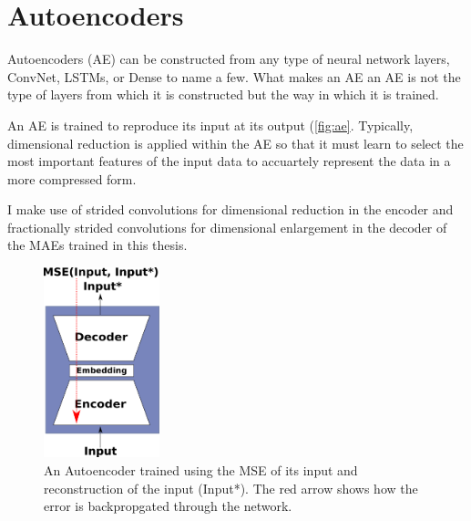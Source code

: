 %
%	
%
%	

\section{Autoencoders}
Autoencoders (AE) can be constructed from any type of neural network layers, ConvNet, LSTMs, or Dense to name a few. What makes an AE an AE is not the type of layers from which it is constructed but the way in which it is trained.

An AE is trained to reproduce its input at its output (\autoref{fig:ae}. Typically, dimensional reduction is applied within the AE so that it must learn to select the most important features of the input data to accuartely represent the data in a more compressed form. 

I make use of strided convolutions for dimensional reduction in the encoder and fractionally strided convolutions for dimensional enlargement in the decoder of the MAEs trained in this thesis.

\begin{figure}
	\centering
	\includegraphics[width=0.3\textwidth]{Figs/intro2dl/AE.png}
	
	\caption{An Autoencoder trained using the MSE of its input and reconstruction of the input (Input*). The red arrow shows how the error is backpropgated through the network.}
	\label{fig:ae}
\end{figure}




